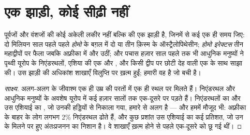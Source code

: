 \section{एक झाड़ी, कोई सीढ़ी नहीं}

\begin{proposition}[एक साथ कई जातियाँ]\label{prop:g12:human-evolution:bush}
 पूर्वजों और वंशजों की कोई अकेली लकीर नहीं बल्कि  की एक
झाड़ी है, जिनमें से कई एक ही समय जिए: दो मिलियन साल पहले पहले \emph{होमो} के
बग़ल में दो या तीन क़िस्म के ऑस्ट्रैलोपिथेसीन; \emph{होमो इरेक्टस} तीन
महाद्वीपों पर फैला जबकि अफ़्रीका में और  उठीं; और पचास हज़ार साल
पहले तक भी आधुनिक मनुष्यों ने पृथ्वी यूरोप के निएंडरथलों, एशिया की एक और
, और किसी द्वीप पर छोटी देह वाली एक  के साथ साझा की। उस झाड़ी की
अधिकांश शाखाएँ विलुप्ति पर ख़त्म हुईं; हमारी वह है जो बची है।
\end{proposition}
\begin{proof}[साक्ष्य]
अलग-अलग  के जीवाश्म एक ही उम्र की परतों में एक ही स्थल पर मिलते हैं।
निएंडरथल और आधुनिक मनुष्यों के अवशेष यूरोप में कई हज़ार सालों तक एक-दूसरे
पर पड़ते हैं। निएंडरथलों का और उस एशियाई  का , जो उनकी हड्डियों से
निकाला गया, हमारे  से अलग है --- और हममें मौजूद भी: अफ़्रीका के बाहर के
लोग लगभग 2\% निएंडरथल  ढोते हैं, और कुछ प्रशांत  उस एशियाई
 का कई प्रतिशत, जो उन  के मिलने पर हुए अंतःप्रजनन का निशान है।
वे शाखाएँ ख़त्म होने से पहले एक-दूसरे को छू गई थीं।
\end{proof}

